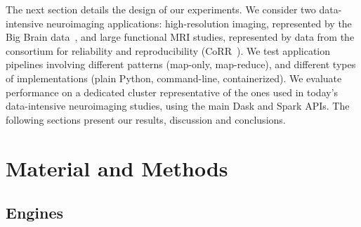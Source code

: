 \documentclass[conference]{IEEEtran}
\begin{document}
The next section details the design of our experiments. We consider two
data-intensive neuroimaging applications: high-resolution imaging,
represented by the Big Brain data~\cite{Amunts:13}, and large functional
MRI studies, represented by data from the consortium for reliability and
reproducibility (CoRR~\cite{zuo2014open}). We test application pipelines
involving different patterns (map-only, map-reduce), and different types of
implementations (plain Python, command-line,
containerized). We evaluate performance on a dedicated cluster
representative of the ones used in today's data-intensive neuroimaging
studies, using the main Dask and Spark APIs. The following sections present
our results, discussion and conclusions.



\section{Material and Methods}

\subsection{Engines}
\end{document}
